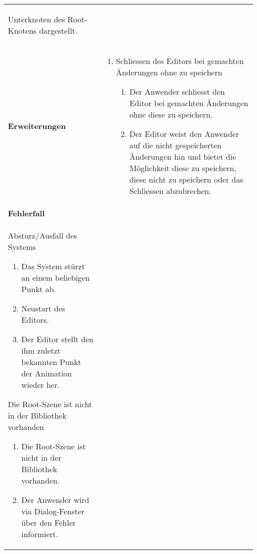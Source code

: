 \begin{longtabu}{p{0.5\textwidth}p{0.5\textwidth}}
\begin{enumerate}
{                    Unterknoten des Root-Knotens dargestellt.}
        \end{enumerate} \\
    \cmidrule(r){1-1}\cmidrule(lr){2-2}
        \textbf{Erweiterungen} &
        \begin{enumerate}[label= (\alph*)]
            \item{Schliessen des Editors bei gemachten Änderungen ohne zu
                    speichern
                \begin{enumerate}[label= (\roman*)]
                    \item{Der Anwender schliesst den Editor bei gemachten
                            Änderungen ohne diese zu speichern.}
                    \item{Der Editor weist den Anwender auf die
                            nicht gespeicherten Änderungen hin und bietet
                            die Möglichkeit diese zu speichern, diese nicht
                            zu speichern oder das Schliessen abzubrechen.}
                \end{enumerate}
            }
        \end{enumerate} \\
    \cmidrule(r){1-1}\cmidrule(lr){2-2}
    \textbf{Fehlerfall} &
        \begin{enumerate} \\
            \item{Absturz/Ausfall des Systems
                \begin{enumerate}[label= (\roman*)]
                        \item{Das System stürzt an einem beliebigen Punkt
                                ab.}
                        \item{Neustart des Editors.}
                        \item{Der Editor stellt den ihm zuletzt bekannten
                                Punkt der Animation wieder her.}
                \end{enumerate}
            }
            \item{Die Root-Szene ist nicht in der Bibliothek vorhanden
                \begin{enumerate}[label= (\roman*)]
                    \item{Die Root-Szene ist nicht in der Bibliothek vorhanden.}
                    \item{Der Anwender wird via Dialog-Fenster über den Fehler
                            informiert.}

\end{enumerate}}
\end{enumerate}
\end{longtabu}
